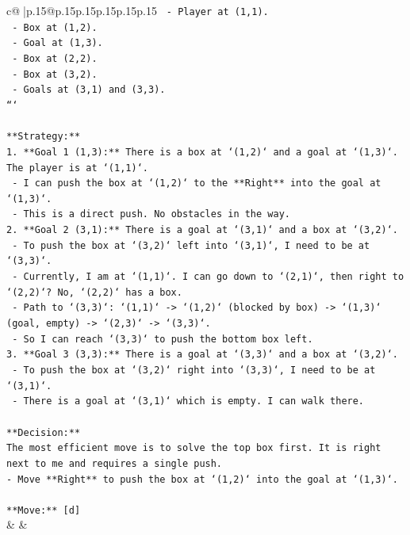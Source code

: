\documentclass{article}
\begin{document}
{\begin{supertabular}{c@{$\;$}|p{.15\linewidth}@{}p{.15\linewidth}p{.15\linewidth}p{.15\linewidth}p{.15\linewidth}p{.15\linewidth}}
{{{\texttt{               {-} Player at (1,1).} \\
\texttt{               {-} Box at (1,2).} \\
\texttt{               {-} Goal at (1,3).} \\
\texttt{               {-} Box at (2,2).} \\
\texttt{               {-} Box at (3,2).} \\
\texttt{               {-} Goals at (3,1) and (3,3).} \\
\texttt{```} \\
\\ 
\texttt{**Strategy:**} \\
\texttt{1.  **Goal 1 (1,3):** There is a box at `(1,2)` and a goal at `(1,3)`. The player is at `(1,1)`.} \\
\texttt{    {-}   I can push the box at `(1,2)` to the **Right** into the goal at `(1,3)`.} \\
\texttt{    {-}   This is a direct push. No obstacles in the way.} \\
\texttt{2.  **Goal 2 (3,1):** There is a goal at `(3,1)` and a box at `(3,2)`.} \\
\texttt{    {-}   To push the box at `(3,2)` left into `(3,1)`, I need to be at `(3,3)`.} \\
\texttt{    {-}   Currently, I am at `(1,1)`. I can go down to `(2,1)`, then right to `(2,2)`? No, `(2,2)` has a box.} \\
\texttt{    {-}   Path to `(3,3)`: `(1,1)` {-}> `(1,2)` (blocked by box) {-}> `(1,3)` (goal, empty) {-}> `(2,3)` {-}> `(3,3)`.} \\
\texttt{    {-}   So I can reach `(3,3)` to push the bottom box left.} \\
\texttt{3.  **Goal 3 (3,3):** There is a goal at `(3,3)` and a box at `(3,2)`.} \\
\texttt{    {-}   To push the box at `(3,2)` right into `(3,3)`, I need to be at `(3,1)`.} \\
\texttt{    {-}   There is a goal at `(3,1)` which is empty. I can walk there.} \\
\\ 
\texttt{**Decision:**} \\
\texttt{The most efficient move is to solve the top box first. It is right next to me and requires a single push.} \\
\texttt{{-}   Move **Right** to push the box at `(1,2)` into the goal at `(1,3)`.} \\
\\ 
\texttt{**Move:** {[}d{]}} \\
            }
        }
    }
    & & \\ \\


\end{supertabular}}
\end{document}
